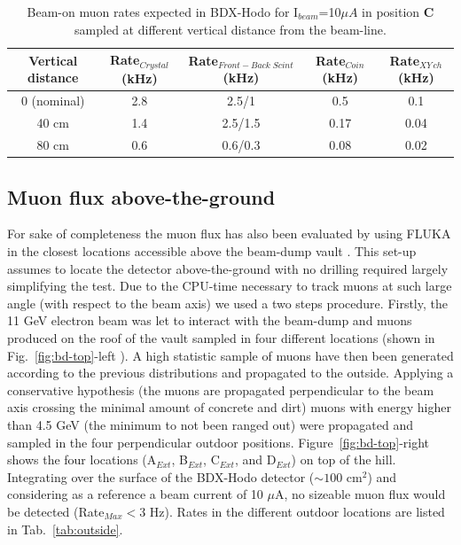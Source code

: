 \begin{table}[htp]
\caption{Beam-on muon rates expected in BDX-Hodo for I$_{beam}$=10$\mu A$ in position {\bf C} sampled at different vertical distance from the beam-line.}
\begin{center}
\begin{tabular}{|c|c|c|c|c|}
\hline
Vertical distance  & Rate$_{Crystal}$  (kHz)&  Rate$_{Front-Back \;Scint} $(kHz) & Rate$_{Coin}$ (kHz) & Rate$_{XY\, ch} $(kHz)\\
\hline\hline
0 (nominal)  & 2.8  &2.5/1    & 0.5 &0.1 \\
 \hline
40 cm & 1.4 &  2.5/1.5 & 0.17 & 0.04 \\
 \hline
80 cm&  0.6  & 0.6/0.3    &  0.08 & 0.02 \\
\hline\hline
\end{tabular}
\end{center}
\label{tab:rate-height}
\end{table}


\subsection{Muon flux above-the-ground}
For sake of completeness the muon flux has also been evaluated by using FLUKA in the closest locations accessible above the  beam-dump vault .  This set-up assumes to locate the detector above-the-ground with no drilling required  largely  simplifying the test.
Due to the CPU-time necessary to track muons at such large angle (with respect to the beam axis) we used a two steps procedure. Firstly, the 11 GeV electron beam was let to interact with the beam-dump and muons produced on the roof of the vault sampled in four  different locations (shown in  Fig.~\ref{fig:bd-top}-left ).
A high statistic sample of muons have then been generated according to the previous distributions and propagated to the outside.  Applying  a conservative hypothesis (the muons are propagated perpendicular to the beam axis  crossing the minimal amount of concrete and dirt) muons with energy higher than 4.5 GeV (the minimum to not been ranged out)  were propagated and sampled in the four  perpendicular outdoor positions. Figure~\ref{fig:bd-top}-right shows the four locations (A$_{Ext}$, B$_{Ext}$, C$_{Ext}$,  and D$_{Ext}$) on top of the hill. Integrating  over the surface of the BDX-Hodo detector ($\sim 100$ cm$^2$) and considering as a reference a beam current of 10 $\mu$A, no sizeable muon flux would be detected (Rate$_{Max}<$3 Hz). Rates in the different outdoor locations are listed in Tab.~\ref{tab:outside}.

